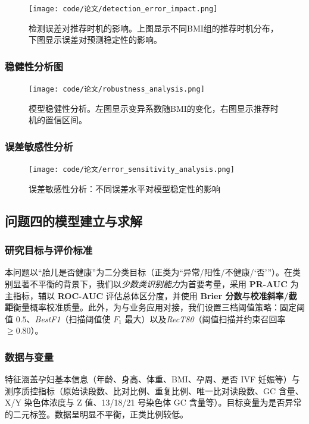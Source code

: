 \documentclass[12pt,a4paper]{ctexart}
\numberwithin{equation}{section}
\theoremstyle{mcm}
\begin{document}
\begin{figure}[H]
\centering
\texttt{[image: code/论文/detection\_error\_impact.png]}
\caption{检测误差对推荐时机的影响。上图显示不同BMI组的推荐时机分布，下图显示误差对预测稳定性的影响。}
\label{fig:error_impact}
\end{figure}

\subsubsection{稳健性分析图}

\begin{figure}[H]
\centering
\texttt{[image: code/论文/robustness\_analysis.png]}
\caption{模型稳健性分析。左图显示变异系数随BMI的变化，右图显示推荐时机的置信区间。}
\label{fig:robustness}
\end{figure}

\subsubsection{误差敏感性分析}

\begin{figure}[H]
\centering
\texttt{[image: code/论文/error\_sensitivity\_analysis.png]}
\caption{误差敏感性分析：不同误差水平对模型稳定性的影响}
\label{fig:sensitivity}
\end{figure}



\subsection{问题四的模型建立与求解}

\subsubsection{研究目标与评价标准}
本问题以“胎儿是否健康”为二分类目标（正类为“异常/阳性/不健康/‘否’”）。在类别显著不平衡的背景下，我们以\emph{少数类识别能力}为首要考量，采用 \textbf{PR-AUC} 为主指标，辅以 \textbf{ROC-AUC} 评估总体区分度，并使用 \textbf{Brier 分数}与\textbf{校准斜率/截距}衡量概率校准质量。此外，为与业务应用对接，我们设置三档阈值策略：固定阈值 $0.5$、\emph{BestF1}（扫描阈值使 $F_1$ 最大）以及\emph{RecT80}（阈值扫描并约束召回率 $\ge 0.80$）。

\subsubsection{数据与变量}
特征涵盖孕妇基本信息（年龄、身高、体重、BMI、孕周、是否 IVF 妊娠等）与测序质控指标（原始读段数、比对比例、重复比例、唯一比对读段数、GC 含量、X/Y 染色体浓度与 Z 值、13/18/21 号染色体 GC 含量等）。目标变量为是否异常的二元标签。数据呈明显不平衡，正类比例较低。
\end{document}
